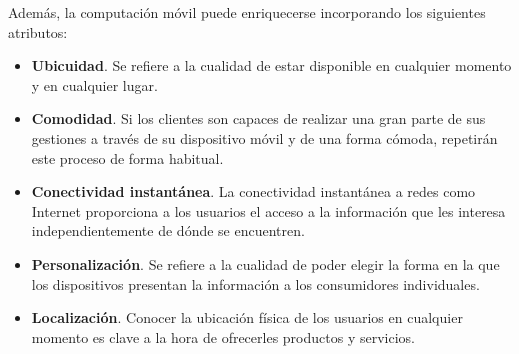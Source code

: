 Además, la computación móvil puede enriquecerse incorporando los siguientes
atributos:
\begin{itemize}
\item \textbf{Ubicuidad}. Se refiere a la cualidad de estar disponible en
cualquier momento y en cualquier lugar.
\item \textbf{Comodidad}. Si los clientes son capaces de realizar una gran
parte de sus gestiones a través de su dispositivo móvil y de una forma cómoda,
repetirán este proceso de forma habitual.
\item \textbf{Conectividad instantánea}. La conectividad instantánea a redes
como Internet proporciona a los usuarios el acceso a la información que les
interesa independientemente de dónde se encuentren.
\item \textbf{Personalización}. Se refiere a la cualidad de poder elegir
la forma en la que los dispositivos presentan la información a los consumidores
individuales.
\item \textbf{Localización}. Conocer la ubicación física de los usuarios en
cualquier momento es clave a la hora de ofrecerles productos y servicios.
\end{itemize}

